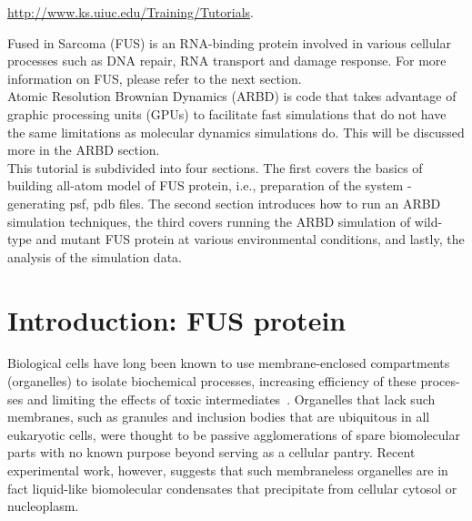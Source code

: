 \documentclass[letterpaper]{article}
\begin{document}
\begin{center}
\href{http://www.ks.uiuc.edu/Training/Tutorials/}{http://www.ks.uiuc.edu/Training/Tutorials}.\\[0.02cm]
\end{center}

Fused in Sarcoma (FUS) is an RNA-binding protein involved in various cellular processes such as DNA repair, RNA transport and damage response. For more information on FUS, please refer to the next section.\\[0.02cm]

Atomic Resolution Brownian Dynamics (ARBD) is code that takes advantage of graphic processing units (GPUs) to facilitate fast simulations that do not have the same limitations as molecular dynamics simulations do.  This will be discussed more in the ARBD section.   \\[0.02cm]

This tutorial is subdivided into four sections. The first covers the basics of building all-atom model of FUS protein, i.e., preparation of the system - generating psf, pdb files. The second section introduces how to run an ARBD simulation techniques, the third covers running the ARBD simulation of wild-type and mutant FUS protein at various environmental conditions, and lastly, the analysis of the simulation data.\\[0.02cm]


\newpage

\section{Introduction: FUS protein}
Biological cells have long been known to use membrane-enclosed compartments (organelles) to isolate biochemical processes, increasing efficiency of these proces-ses and limiting the effects of toxic intermediates~\cite{GENN89}. Organelles that lack such membranes, such as granules and inclusion bodies that are ubiquitous in all eukaryotic cells, were thought to be passive agglomerations of spare biomolecular parts with no known purpose beyond serving as a cellular pantry. Recent experimental work, however, suggests that such membraneless organelles are in fact liquid-like biomolecular condensates that precipitate from cellular cytosol or nucleoplasm.\\[0.02cm]
 
\end{document}
